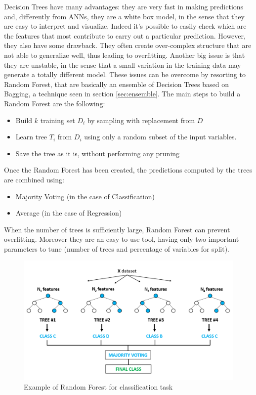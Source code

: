 Decision Trees have many advantages: they are very fast in making predictions and, differently from \acp{ANN}, they are a white box model, in the sense that they are easy to interpret and visualize. Indeed it's possible to easily check which are the features that most contribute to carry out a particular prediction. However, they also have some drawback. They often create over-complex structure that are not able to generalize well, thus leading to overfitting. Another big issue is that they are unstable, in the sense that a small variation in the training data may generate a totally different model.
These issues can be overcome by resorting to Random Forest, that are basically an ensemble of Decision Trees based on Bagging, a technique seen in section \ref{sec:ensemble}.
The main steps to build a Random Forest are the following:
\begin{itemize}
    \item Build $k$ training set $D_{i}$ by sampling with replacement from $D$
    \item Learn tree $T_{i}$ from $D_{i}$ using only a random subset of the input variables.
    \item Save the tree as it is, without performing any pruning
\end{itemize}
Once the Random Forest has been created, the predictions computed by the trees are combined using:
\begin{itemize}
    \item Majority Voting (in the case of Classification)
    \item Average (in the case of Regression)
\end{itemize}

When the number of trees is sufficiently large, Random Forest can prevent overfitting. Moreover they are an easy to use tool, having only two important parameters to tune (number of trees and percentage of variables for split).
  \begin{figure}[htbp!]
\centering
\includegraphics[scale=0.35]{Tesi/images/rf.pdf}
\caption{Example of Random Forest for classification task}
\label{fig:fourteenth_figure}
\end{figure}


